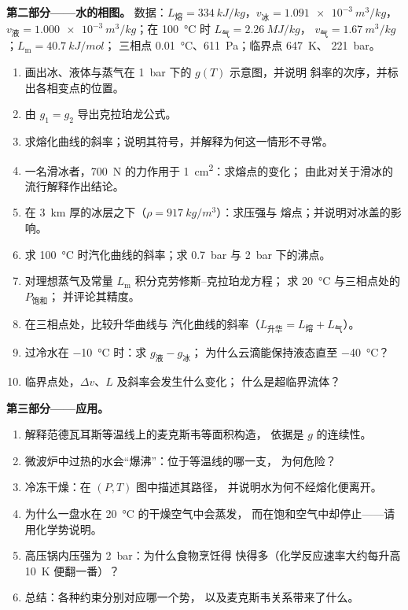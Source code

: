 \begin{problem}
\textbf{第二部分——水的相图。}
数据：$L_{\text{熔}} = \qty{334}{kJ/kg}$，$v_{\text{冰}} = \qty{1.091e-3}{m^3/kg}$，
$v_{\text{液}} = \qty{1.000e-3}{m^3/kg}$；在 \qty{100}{\celsius} 时 $L_{\text{气}} = \qty{2.26}{MJ/kg}$，
$v_{\text{气}} = \qty{1.67}{m^3/kg}$；$L_{\text{m}} = \qty{40.7}{kJ/mol}$；
三相点 \qty{0.01}{\celsius}、\qty{611}{Pa}；临界点 \qty{647}{K}、
\qty{221}{bar}。
\begin{enumerate}[resume]
  \item 画出冰、液体与蒸气在 \qty{1}{bar} 下的 $g(T)$ 示意图，并说明
        斜率的次序，并标出各相变点的位置。
  \item 由 $g_1 = g_2$ 导出克拉珀龙公式。
  \item 求熔化曲线的斜率；说明其符号，并解释为何这一情形不寻常。
  \item 一名滑冰者，\qty{700}{N} 的力作用于 \qty{1}{cm^2}：求熔点的变化；
        由此对关于滑冰的流行解释作出结论。
  \item 在 \qty{3}{km} 厚的冰层之下（$\rho = \qty{917}{kg/m^3}$）：求压强与
        熔点；并说明对冰盖的影响。
  \item 求 \qty{100}{\celsius} 时汽化曲线的斜率；求
        \qty{0.7}{bar} 与 \qty{2}{bar} 下的沸点。
  \item 对理想蒸气及常量 $L_{\text{m}}$ 积分克劳修斯–克拉珀龙方程；
        求 \qty{20}{\celsius} 与三相点处的 $P_{\text{饱和}}$；
        并评论其精度。
  \item 在三相点处，比较升华曲线与
        汽化曲线的斜率（$L_{\text{升华}} = L_{\text{熔}} + L_{\text{气}}$）。
  \item 过冷水在 \qty{-10}{\celsius} 时：求 $g_{\text{液}} - g_{\text{冰}}$；
        为什么云滴能保持液态直至 \qty{-40}{\celsius}？
  \item 临界点处，$\Delta v$、$L$ 及斜率会发生什么变化；
        什么是超临界流体？
\end{enumerate}

\textbf{第三部分——应用。}
\begin{enumerate}[resume]
  \item 解释范德瓦耳斯等温线上的麦克斯韦等面积构造，
        依据是 $g$ 的连续性。
  \item 微波炉中过热的水会“爆沸”：位于等温线的哪一支，
        为何危险？
  \item 冷冻干燥：在 $(P,T)$ 图中描述其路径，
        并说明水为何不经熔化便离开。
  \item 为什么一盘水在 \qty{20}{\celsius} 的干燥空气中会蒸发，
        而在饱和空气中却停止——请用化学势说明。
  \item 高压锅内压强为 \qty{2}{bar}：为什么食物烹饪得
        快得多（化学反应速率大约每升高
        \qty{10}{K} 便翻一番）？
  \item 总结：各种约束分别对应哪一个势，
        以及麦克斯韦关系带来了什么。
\end{enumerate}
\end{problem}

